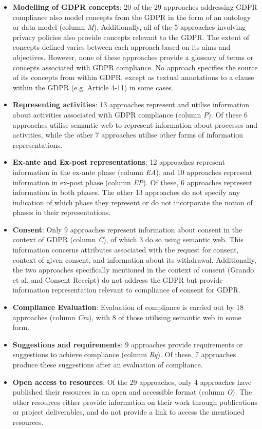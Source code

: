 \begin{itemize}
    \item \textbf{Modelling of GDPR concepts}: 20 of the 29 approaches addressing GDPR compliance also model concepts from the GDPR in the form of an ontology or data model (column \textit{M}). Additionally, all of the 5 approaches involving privacy policies also provide concepts relevant to the GDPR. The extent of concepts defined varies between each approach based on its aims and objectives. However, none of these approaches provide a glossary of terms or concepts associated with GDPR compliance. No approach specifies the source of its concepts from within GDPR, except as textual annotations to a clause within the GDPR (e.g. Article 4-11) in some cases.
    
    \item \textbf{Representing activities}: 13 approaches represent and utilise information about activities associated with GDPR compliance (column \textit{P}). Of these 6 approaches utilise semantic web to represent information about processes and activities, while the other 7 approaches utilise other forms of information representations.
    
    \item \textbf{Ex-ante and Ex-post representations}: 12 approaches represent information in the ex-ante phase (column \textit{EA}), and 10 approaches represent information in ex-post phase (column \textit{EP}). Of these, 6 approaches represent information in both phases. The other 13 approaches do not specify any indication of which phase they represent or do not incorporate the notion of phases in their representations.
    
    \item \textbf{Consent}: Only 9 approaches represent information about consent in the context of GDPR (column \textit{C}), of which 3 do so using semantic web. This information concerns attributes associated with the request for consent, context of given consent, and information about its withdrawal. Additionally, the two approaches specifically mentioned in the context of consent (Grando et al. and Consent Receipt) do not address the GDPR but provide information representation relevant to compliance of consent for GDPR.
    
    \item \textbf{Compliance Evaluation}: Evaluation of compliance is carried out by 18 approaches (column \textit{Cm}), with 8 of those utilising semantic web in some form. 
    
    \item \textbf{Suggestions and requirements}: 9 approaches provide requirements or suggestions to achieve compliance (column \textit{Rq}). Of these, 7 approaches produce these suggestions after an evaluation of compliance.
    
    \item \textbf{Open access to resources}: Of the 29 approaches, only 4 approaches have published their resources in an open and accessible format (column \textit{O}). The other resources either provide information on their work through publications or project deliverables, and do not provide a link to access the mentioned resources.
\end{itemize}

